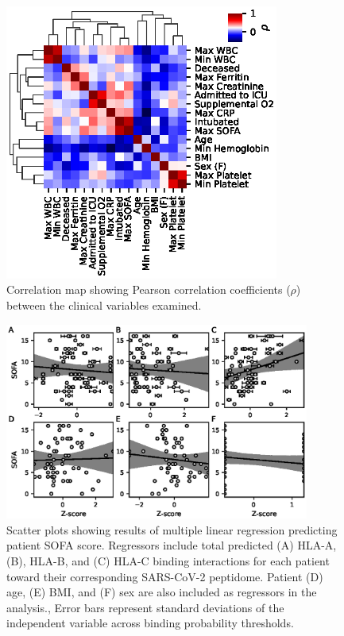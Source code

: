 \documentclass[utf8]{frontiers_suppmat} %
\begin{document}
\onecolumn
{}

\title {{}}


\maketitle






\begin{figure}[htbp]
\begin{center}
\includegraphics[width=9cm]{FigureS1}%
\end{center}
\caption{Correlation map showing Pearson correlation coefficients ($\rho$) between the clinical variables examined.}\label{fig:1}
\end{figure}


\begin{figure}[htbp]
\begin{center}
\includegraphics[width=10cm]{FigureS2}
\end{center}
\caption{Scatter plots showing results of multiple linear regression predicting patient SOFA score. Regressors include total predicted (A) HLA-A, (B), HLA-B, and (C) HLA-C binding interactions for each patient toward their corresponding SARS-CoV-2 peptidome. Patient (D) age, (E) BMI, and (F) sex are also included as regressors in the analysis., Error bars represent standard deviations of the independent variable across binding probability thresholds.}\label{fig:2}
\end{figure}
\end{document}
